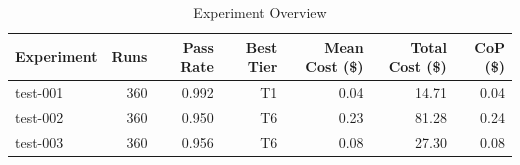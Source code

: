 \begin{table}[htbp]
\centering
\caption{Experiment Overview}
\label{tab:experiment_overview}
\small
\begin{tabular}{lrrrrrr}
\toprule
Experiment & Runs & Pass Rate & Best Tier & Mean Cost (\$) & Total Cost (\$) & CoP (\$) \\
\midrule
test-001 & 360 & 0.992 & T1 & 0.04 & 14.71 & 0.04 \\
test-002 & 360 & 0.950 & T6 & 0.23 & 81.28 & 0.24 \\
test-003 & 360 & 0.956 & T6 & 0.08 & 27.30 & 0.08 \\
\bottomrule
\end{tabular}
\end{table}